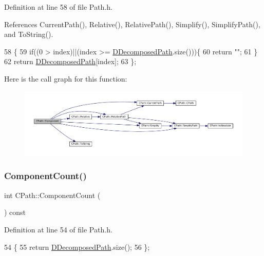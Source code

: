 Definition at line 58 of file Path.\+h.



References Current\+Path(), Relative(), Relative\+Path(), Simplify(), Simplify\+Path(), and To\+String().


\begin{DoxyCode}
58                                             \{
59             \textcolor{keywordflow}{if}((0 > index)||(index >= \hyperlink{classCPath_a03ed25209a01e633c107a0c877fc61f8}{DDecomposedPath}.size()))\{
60                 \textcolor{keywordflow}{return} \textcolor{stringliteral}{""};   
61             \}
62             \textcolor{keywordflow}{return} \hyperlink{classCPath_a03ed25209a01e633c107a0c877fc61f8}{DDecomposedPath}[index];  
63         \};
\end{DoxyCode}
Here is the call graph for this function\+:\nopagebreak
\begin{figure}[H]
\begin{center}
\leavevmode
\includegraphics[width=350pt]{classCPath_a7396f770babe0fbea344afa76d31da7c_cgraph}
\end{center}
\end{figure}
\hypertarget{classCPath_ab399818c519c46871306f9851dd8141d}{}\label{classCPath_ab399818c519c46871306f9851dd8141d} 
\subsubsection{\texorpdfstring{Component\+Count()}{ComponentCount()}}
{\footnotesize\ttfamily int C\+Path\+::\+Component\+Count (\begin{DoxyParamCaption}{ }\end{DoxyParamCaption}) const\hspace{0.3cm}{\ttfamily [inline]}}



Definition at line 54 of file Path.\+h.


\begin{DoxyCode}
54                                   \{
55             \textcolor{keywordflow}{return} \hyperlink{classCPath_a03ed25209a01e633c107a0c877fc61f8}{DDecomposedPath}.size();
56         \};
\end{DoxyCode}
\hypertarget{classCPath_a24d8c455b1663ce251d3a749437fa4fe}{}\label{classCPath_a24d8c455b1663ce251d3a749437fa4fe} 
